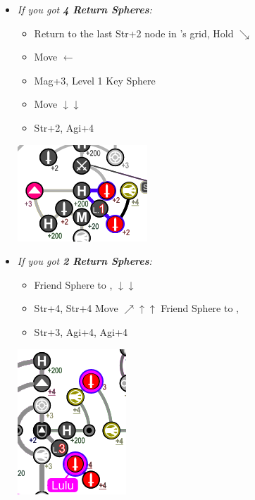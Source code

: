 \begin{spheregrid}
\begin{multicols}{2}
\begin{itemize}
      \yunaf
      \begin{itemize}
        \item \textit{If you got \textbf{4 Return Spheres}:}
              \begin{itemize}
                \item Return to the last Str+2 node in \wakka's grid, Hold $\searrow$
                \item Move $\leftarrow$
                \item Mag+3, Level 1 Key Sphere
                \item Move $\downarrow\downarrow$
                \item Str+2, Agi+4
              \end{itemize}
              \includegraphics[width=.5\columnwidth]{graphics/4_returns_1}
        \item \textit{If you got \textbf{2 Return Spheres}:}
              \begin{itemize}
                \item Friend Sphere to \lulu,  $\downarrow\downarrow$
                \item Str+4, Str+4
                      \luluf Move $\nearrow\uparrow\uparrow$
                      \yunaf Friend Sphere to \lulu,
                \item Str+3, Agi+4, Agi+4
              \end{itemize}
              \includegraphics[width=.4\columnwidth]{graphics/2_and_2}

\end{itemize}
\end{itemize}
\end{multicols}
\end{spheregrid}
